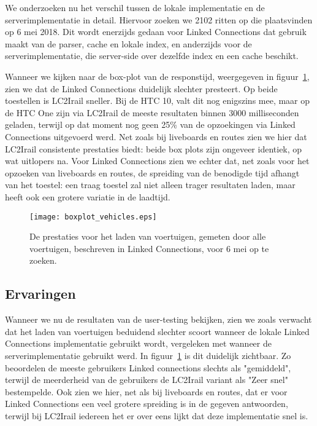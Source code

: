 We onderzoeken nu het verschil tussen de lokale implementatie en de serverimplementatie in detail. Hiervoor zoeken we 2102 ritten op die plaatsvinden op 6 mei 2018. Dit wordt enerzijds gedaan voor Linked Connections dat gebruik maakt van de  parser, cache en lokale index, en anderzijds voor de serverimplementatie, die server-side over dezelfde index en een cache beschikt.

Wanneer we kijken naar de box-plot van de responstijd, weergegeven in figuur~\ref{fig:vehicleboxplot}, zien we dat de Linked Connections duidelijk slechter presteert. Op beide toestellen is LC2Irail sneller. Bij de HTC 10, valt dit nog enigszins mee, maar op de HTC One zijn via LC2Irail de meeste resultaten binnen 3000 milliseconden geladen, terwijl op dat moment nog geen 25\% van de opzoekingen via Linked Connections uitgevoerd werd. Net zoals bij liveboards en routes zien we hier dat LC2Irail consistente prestaties biedt: beide box plots zijn ongeveer identiek, op wat uitlopers na. Voor Linked Connections zien we echter dat, net zoals voor het opzoeken van liveboards en routes, de spreiding van de benodigde tijd afhangt van het toestel: een traag toestel zal niet alleen trager resultaten laden, maar heeft ook een grotere variatie in de laadtijd.

\begin{figure}[h]
	\centering
	\texttt{[image: boxplot\_vehicles.eps]}
	\caption[Prestaties voor het laden van voertuigen]{De prestaties voor het laden van voertuigen, gemeten door alle voertuigen, beschreven in Linked Connections, voor 6 mei op te zoeken.}
	\label{fig:vehicleboxplot}
\end{figure}


\subsection{Ervaringen}
Wanneer we nu de resultaten van de user-testing bekijken, zien we zoals verwacht dat het laden van voertuigen beduidend slechter scoort wanneer de lokale Linked Connections implementatie gebruikt wordt, vergeleken met wanneer de serverimplementatie gebruikt werd. In figuur~\ref{fig:vehicleboxplot} is dit duidelijk zichtbaar. Zo beoordelen de meeste gebruikers Linked connections slechts als "gemiddeld", terwijl de meerderheid van de gebruikers de LC2Irail variant als "Zeer snel" bestempelde. Ook zien we hier, net als bij liveboards en routes, dat er voor Linked Connections een veel grotere spreiding is in de gegeven antwoorden, terwijl bij LC2Irail iedereen het er over eens lijkt dat deze implementatie snel is.

